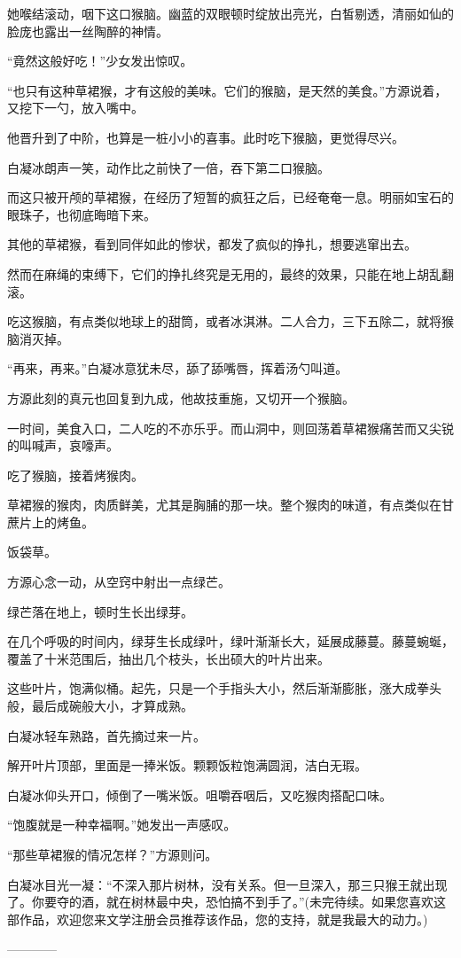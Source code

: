 \begin{this_body}
她喉结滚动，咽下这口猴脑。幽蓝的双眼顿时绽放出亮光，白皙剔透，清丽如仙的脸庞也露出一丝陶醉的神情。

“竟然这般好吃！”少女发出惊叹。

“也只有这种草裙猴，才有这般的美味。它们的猴脑，是天然的美食。”方源说着，又挖下一勺，放入嘴中。

他晋升到了中阶，也算是一桩小小的喜事。此时吃下猴脑，更觉得尽兴。

白凝冰朗声一笑，动作比之前快了一倍，吞下第二口猴脑。

而这只被开颅的草裙猴，在经历了短暂的疯狂之后，已经奄奄一息。明丽如宝石的眼珠子，也彻底晦暗下来。

其他的草裙猴，看到同伴如此的惨状，都发了疯似的挣扎，想要逃窜出去。

然而在麻绳的束缚下，它们的挣扎终究是无用的，最终的效果，只能在地上胡乱翻滚。

吃这猴脑，有点类似地球上的甜筒，或者冰淇淋。二人合力，三下五除二，就将猴脑消灭掉。

“再来，再来。”白凝冰意犹未尽，舔了舔嘴唇，挥着汤勺叫道。

方源此刻的真元也回复到九成，他故技重施，又切开一个猴脑。

一时间，美食入口，二人吃的不亦乐乎。而山洞中，则回荡着草裙猴痛苦而又尖锐的叫喊声，哀嚎声。

吃了猴脑，接着烤猴肉。

草裙猴的猴肉，肉质鲜美，尤其是胸脯的那一块。整个猴肉的味道，有点类似在甘蔗片上的烤鱼。

饭袋草。

方源心念一动，从空窍中射出一点绿芒。

绿芒落在地上，顿时生长出绿芽。

在几个呼吸的时间内，绿芽生长成绿叶，绿叶渐渐长大，延展成藤蔓。藤蔓蜿蜒，覆盖了十米范围后，抽出几个枝头，长出硕大的叶片出来。

这些叶片，饱满似桶。起先，只是一个手指头大小，然后渐渐膨胀，涨大成拳头般，最后成碗般大小，才算成熟。

白凝冰轻车熟路，首先摘过来一片。

解开叶片顶部，里面是一捧米饭。颗颗饭粒饱满圆润，洁白无瑕。

白凝冰仰头开口，倾倒了一嘴米饭。咀嚼吞咽后，又吃猴肉搭配口味。

“饱腹就是一种幸福啊。”她发出一声感叹。

“那些草裙猴的情况怎样？”方源则问。

白凝冰目光一凝：“不深入那片树林，没有关系。但一旦深入，那三只猴王就出现了。你要夺的酒，就在树林最中央，恐怕搞不到手了。”(未完待续。如果您喜欢这部作品，欢迎您来文学注册会员推荐该作品，您的支持，就是我最大的动力。)

------------

\end{this_body}

